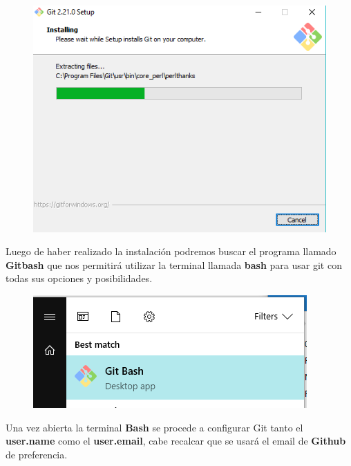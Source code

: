 \documentclass{article}
\begin{document}
\begin{figure}[h!]
  \centering
  \includegraphics[scale=0.75]{./imagenes/Gitbash3.png}
\end{figure}

\clearpage

Luego de haber realizado la instalación podremos buscar el programa
llamado \textbf{Gitbash} que nos permitirá utilizar la terminal llamada
\textbf{bash} para usar git con todas sus opciones y posibilidades.

\begin{figure}[h!]
  \centering
  \includegraphics[scale=0.75]{./imagenes/Gitbash4.png}
\end{figure}

Una vez abierta la terminal \textbf{Bash} se procede a configurar Git tanto
el \textbf{user.name} como el \textbf{user.email}, cabe recalcar que se usará el
email de \textbf{Github} de preferencia.
\end{document}
